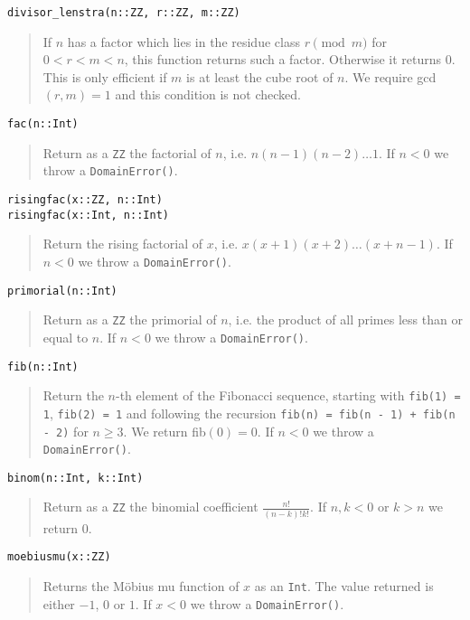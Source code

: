 \documentclass[a4paper,10pt]{article}
\newcommand{\code}{\lstinline}
\newcommand{\desc}[1]{\vspace{-3mm}\begin{quote}#1\end{quote}}
\begin{document}
{{{\begin{lstlisting}
divisor_lenstra(n::ZZ, r::ZZ, m::ZZ)
\end{lstlisting}

\desc{If $n$ has a factor which lies in the residue class $r \pmod{m}$ for $0 < r < m < n$,
this function returns such a factor. Otherwise it returns $0$. This is only efficient if 
$m$ is at least the cube root of $n$. We require gcd$(r, m) = 1$ and this condition is not
checked.}

\begin{lstlisting}
fac(n::Int)
\end{lstlisting}

\desc{Return as a \code{ZZ} the factorial of $n$, i.e. $n(n - 1)(n - 2)\ldots 1$.
If $n < 0$ we throw a \code{DomainError()}.}

\begin{lstlisting}
risingfac(x::ZZ, n::Int)
risingfac(x::Int, n::Int)
\end{lstlisting}

\desc{Return the rising factorial of $x$, i.e. $x(x + 1)(x + 2)\ldots (x + n - 1)$.
If $n < 0$ we throw a \code{DomainError()}.}

\begin{lstlisting}
primorial(n::Int)
\end{lstlisting}

\desc{Return as a \code{ZZ} the primorial of $n$, i.e. the product of all primes
less than or equal to $n$. If $n < 0$ we throw a \code{DomainError()}.}

\begin{lstlisting}
fib(n::Int)
\end{lstlisting}

\desc{Return the $n$-th element of the Fibonacci sequence, starting with 
\code{fib(1) = 1}, \code{fib(2) = 1} and following the recursion 
\code{fib(n) = fib(n - 1) + fib(n - 2)} for $n \geq 3$.
We return fib$(0) = 0$. If $n < 0$ we throw a \code{DomainError()}.}

\begin{lstlisting}
binom(n::Int, k::Int)
\end{lstlisting}

\desc{Return as a \code{ZZ} the binomial coefficient $\frac{n!}{(n - k)!k!}$. If
$n, k < 0$ or $k > n$ we return $0$.}

\begin{lstlisting}
moebiusmu(x::ZZ)
\end{lstlisting}

\desc{Returns the M\"{o}bius mu function of $x$ as an \code{Int}. The value returned is
either $-1$, $0$ or $1$. If $x < 0$ we throw a \code{DomainError()}.}

}}}
\end{document}
